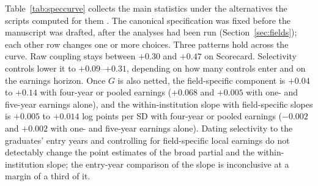 \documentclass[11pt]{article}
\begin{document}
Table~\ref{tab:speccurve} collects the main statistics under the alternatives the scripts computed for them
\citep{simonsohn2020specification}. The canonical specification was fixed before the manuscript was drafted,
after the analyses had been run (Section~\ref{sec:fields}); each other row changes one or more choices. Three
patterns hold across the curve. Raw coupling stays between $+0.30$ and $+0.47$ on Scorecard. Selectivity controls
lower it to $+0.09$--$+0.31$, depending on how many controls enter and on the earnings horizon. Once $G$ is also netted, the field-specific component is $+0.04$ to $+0.14$ with four-year or pooled
earnings ($+0.068$ and $+0.005$ with one- and five-year earnings alone), and the within-institution slope with
field-specific slopes is $+0.005$ to $+0.014$ log points per SD with four-year or pooled earnings ($-0.002$ and
$+0.002$ with one- and five-year earnings alone). Dating selectivity to the graduates' entry years and controlling
for field-specific local earnings do not detectably change the point estimates of the broad partial and the
within-institution slope; the entry-year comparison of the slope is inconclusive at a margin of a third of it.
\end{document}
